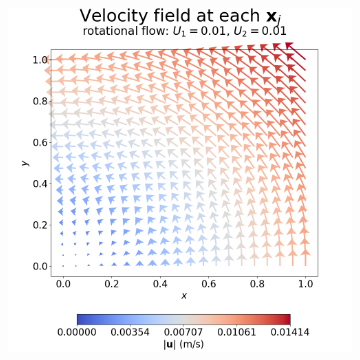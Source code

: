             \begin{figure}
                \begin{subfigure}{0.4\textwidth}
                    \centering
                    \includegraphics[width=\textwidth]{diagrams/results-mri/simple-tests/mri-spins_quiver_2D_rotational_test_4.png}
                    \caption{}
                    \label{fig:mri-rotational:quiver}
                \end{subfigure}
                \vspace{4mm} %
                \begin{subfigure}{0.4\textwidth}
                    \centering

\end{subfigure}
\end{figure}

